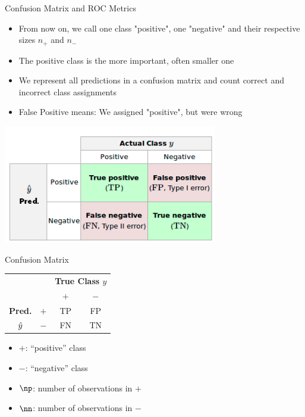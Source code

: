 \documentclass[11pt,compress,t,notes=noshow, xcolor=table]{beamer}
\begin{document}
 \begin{vbframe}{Confusion Matrix and ROC Metrics}
 \begin{itemize}
   \item From now on, we call one class "positive", one "negative" and their respective sizes
     $n_+$ and $n_-$
   \item The positive class is the more important, often smaller one
   \item We represent all predictions in a confusion matrix and count correct and incorrect class assignments
   \item False Positive means: We assigned "positive", but were wrong
 \end{itemize}
 \includegraphics[width=0.7\textwidth]{figure_man/roc-confmatrix1.png}
 \end{vbframe}


\begin{vbframe}{Confusion Matrix}

\begin{center}
\small
\renewcommand{\arraystretch}{1.5}
\begin{tabular}{cc||cc}
    & & \multicolumn{2}{c}{\bfseries True Class $y$}  \\
    & & $+$ & $-$  \\ 
    \hline \hline
    \bfseries Pred.     & $+$ & TP & FP\\
              $\hat{y}$ & $-$ & FN & TN\\ 
\end{tabular}
\renewcommand{\arraystretch}{1}
\end{center}

\begin{itemize}
  \item $+$: \enquote{positive} class
  \item $-$: \enquote{negative} class
  \item $\np$: number of observations in $+$
  \item $\nn$: number of observations in $-$
\end{itemize}
\end{vbframe}
\end{document}
